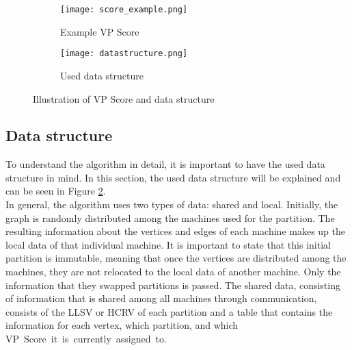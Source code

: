 \documentclass[acmsmall,nonacm,screen,review]{acmart}
\begin{document}
\begin{figure}[bt!]
     \centering
     \begin{subfigure}[b]{0.45\textwidth}
         \centering
         \texttt{[image: score\_example.png]}
         \caption{Example VP Score}
         \label{vp_score}
     \end{subfigure}
     \hfill
     \begin{subfigure}[b]{0.45\textwidth}
         \centering
         \texttt{[image: datastructure.png]}
         \caption{Used data structure}
         \label{data_structure}
     \end{subfigure}
     \caption{Illustration of VP Score and data structure}
     \label{combi}
\end{figure}
\subsection{Data structure}
To understand the algorithm in detail, it is important to have the used data structure in mind. In this section, the used data structure will be explained and can be seen in Figure \ref{data_structure}. \\
In general, the algorithm uses two types of data: shared and local. Initially, the graph is randomly distributed among the machines used for the partition. The resulting information about the vertices and edges of each machine makes up the local data of that individual machine. It is important to state that this initial partition is immutable, meaning that once the vertices are distributed among the machines, they are not relocated to the local data of another machine. Only the information that they swapped partitions is passed. The shared data, consisting of information that is shared among all machines through communication, consists of the LLSV or HCRV of each partition and a table that contains the information for each vertex, which partition, and which \hbox{VP Score it is currently assigned to.}
\end{document}
